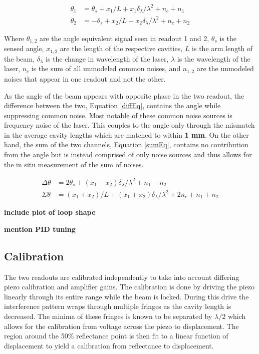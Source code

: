 \documentclass [12pt, proquest]{uwthesis}[2019]
\begin{document}
\begin{align}
\theta_1&=\theta_s+x_1/L+x_1 \delta_\lambda/\lambda^2+n_c+n_1 \label{th1} \\
\theta_2&=-\theta_s+x_2/L+x_2 \delta_\lambda/\lambda^2 + n_c+n_2 \label{th2}
\end{align}

Where $\theta_{1,2}$ are the angle equivalent signal seen in readout 1 and 2, $\theta_{s}$ is the sensed angle, $x_{1,2}$ are the length of the respective cavities, $L$ is the arm length of the beam, $\delta_\lambda$ is the change in wavelength of the laser, $\lambda$ is the wavelength of the laser, $n_c$ is the sum of all unmodeled common noises, and $n_{1,2}$ are the unmodeled noises that appear in one readout and not the other.

As the angle of the beam appears with opposite phase in the two readout, the difference between the two, Equation \ref{diffEq}, contains the angle while suppressing common noise. Most notable of these common noise sources is frequency noise of the laser. This couples to the angle only through the mismatch in the average cavity lengths which are matched to within \textbf{1 mm}. On the other hand, the sum of the two channels, Equation \ref{sumEq}, contains no contribution from the angle but is instead comprised of only noise sources and thus allows for the in situ measurement of the sum of noises.


\begin{align}
\Delta \theta&=2\theta_s+ (x_1-x_2)\delta_\lambda/\lambda^2+n_1-n_2 \label{diffEq} \\
\Sigma \theta&=(x_1+x_2)/L+ (x_1+x_2)\delta_\lambda/\lambda^2+2n_c+n_1+n_2 \label{sumEq}
\end{align}

\textbf{include plot of loop shape}

\textbf{mention PID tuning}

\subsection{Calibration}

The two readouts are calibrated independently to take into account differing piezo calibration and amplifier gains. The calibration is done by driving the piezo linearly through its entire range while the beam is locked. During this drive the interference pattern wraps through multiple fringes as the cavity length is decreased. The minima of these fringes is known to be separated by $\lambda/2$ which allows for the calibration from voltage across the piezo to displacement. The region around the 50\% reflectance point is then fit to a linear function of displacement to yield a calibration from reflectance to displacement.  
\end{document}
